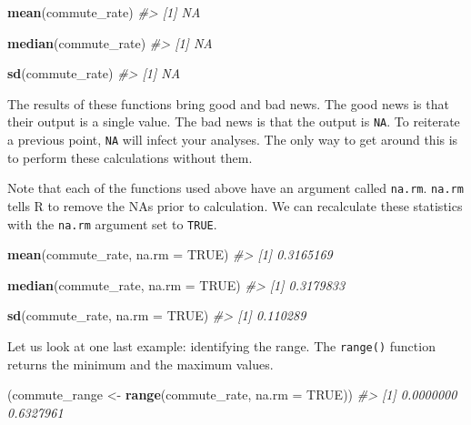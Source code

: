 \documentclass[
]{book}
\newenvironment{Shaded}{\begin{snugshade}}{\end{snugshade}}
\newcommand{\CommentTok}[1]{\textcolor[rgb]{0.56,0.35,0.01}{\textit{#1}}}
\newcommand{\DataTypeTok}[1]{\textcolor[rgb]{0.13,0.29,0.53}{#1}}
\newcommand{\KeywordTok}[1]{\textcolor[rgb]{0.13,0.29,0.53}{\textbf{#1}}}
\newcommand{\NormalTok}[1]{#1}
\newcommand{\OtherTok}[1]{\textcolor[rgb]{0.56,0.35,0.01}{#1}}
\newcommand{\StringTok}[1]{\textcolor[rgb]{0.31,0.60,0.02}{#1}}
\begin{document}
\begin{Shaded}
\begin{Highlighting}[]
\KeywordTok{mean}\NormalTok{(commute\_rate)}
\CommentTok{\#\textgreater{} [1] NA}

\KeywordTok{median}\NormalTok{(commute\_rate)}
\CommentTok{\#\textgreater{} [1] NA}

\KeywordTok{sd}\NormalTok{(commute\_rate)}
\CommentTok{\#\textgreater{} [1] NA}
\end{Highlighting}
\end{Shaded}

The results of these functions bring good and bad news. The good news is that their output is a single value. The bad news is that the output is \texttt{NA}. To reiterate a previous point, \texttt{NA} will infect your analyses. The only way to get around this is to perform these calculations without them.

Note that each of the functions used above have an argument called \texttt{na.rm}. \texttt{na.rm} tells R to remove the NAs prior to calculation. We can recalculate these statistics with the \texttt{na.rm} argument set to \texttt{TRUE}.

\begin{Shaded}
\begin{Highlighting}[]
\KeywordTok{mean}\NormalTok{(commute\_rate, }\DataTypeTok{na.rm =} \OtherTok{TRUE}\NormalTok{)}
\CommentTok{\#\textgreater{} [1] 0.3165169}

\KeywordTok{median}\NormalTok{(commute\_rate, }\DataTypeTok{na.rm =} \OtherTok{TRUE}\NormalTok{)}
\CommentTok{\#\textgreater{} [1] 0.3179833}

\KeywordTok{sd}\NormalTok{(commute\_rate, }\DataTypeTok{na.rm =} \OtherTok{TRUE}\NormalTok{)}
\CommentTok{\#\textgreater{} [1] 0.110289}
\end{Highlighting}
\end{Shaded}

Let us look at one last example: identifying the range. The \texttt{range()} function returns the minimum and the maximum values.

\begin{Shaded}
\begin{Highlighting}[]
\NormalTok{(commute\_range \textless{}{-}}\StringTok{ }\KeywordTok{range}\NormalTok{(commute\_rate, }\DataTypeTok{na.rm =} \OtherTok{TRUE}\NormalTok{))}
\CommentTok{\#\textgreater{} [1] 0.0000000 0.6327961}
\end{Highlighting}
\end{Shaded}
\end{document}
